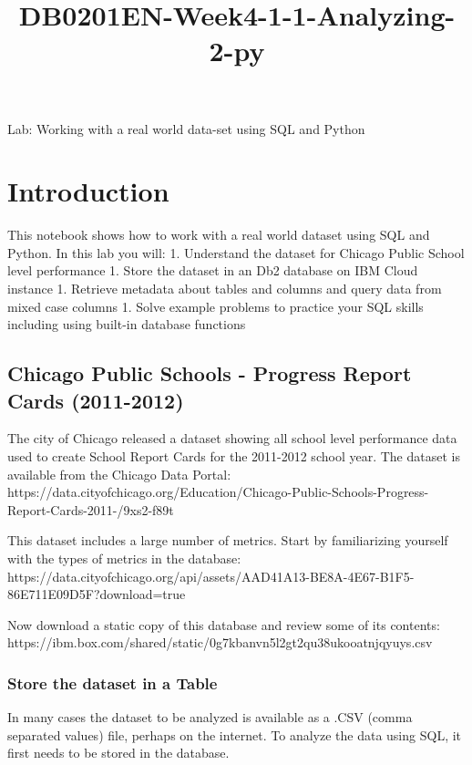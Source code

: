\documentclass[11pt]{article}
\title{DB0201EN-Week4-1-1-Analyzing-2-py}
\begin{document}
    
    
    \maketitle
    
    

    
    Lab: Working with a real world data-set using SQL and Python

    \section{Introduction}\label{introduction}

This notebook shows how to work with a real world dataset using SQL and
Python. In this lab you will: 1. Understand the dataset for Chicago
Public School level performance 1. Store the dataset in an Db2 database
on IBM Cloud instance 1. Retrieve metadata about tables and columns and
query data from mixed case columns 1. Solve example problems to practice
your SQL skills including using built-in database functions

    \subsection{Chicago Public Schools - Progress Report Cards
(2011-2012)}\label{chicago-public-schools---progress-report-cards-2011-2012}

The city of Chicago released a dataset showing all school level
performance data used to create School Report Cards for the 2011-2012
school year. The dataset is available from the Chicago Data Portal:
https://data.cityofchicago.org/Education/Chicago-Public-Schools-Progress-Report-Cards-2011-/9xs2-f89t

This dataset includes a large number of metrics. Start by familiarizing
yourself with the types of metrics in the database:
https://data.cityofchicago.org/api/assets/AAD41A13-BE8A-4E67-B1F5-86E711E09D5F?download=true

Now download a static copy of this database and review some of its
contents:
https://ibm.box.com/shared/static/0g7kbanvn5l2gt2qu38ukooatnjqyuys.csv

    \subsubsection{Store the dataset in a
Table}\label{store-the-dataset-in-a-table}

In many cases the dataset to be analyzed is available as a .CSV (comma
separated values) file, perhaps on the internet. To analyze the data
using SQL, it first needs to be stored in the database.
\end{document}
